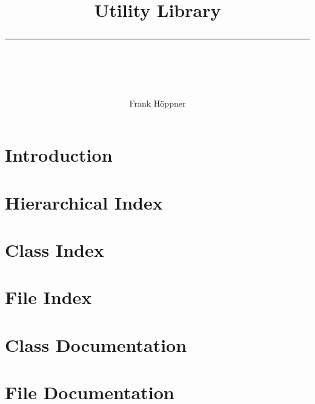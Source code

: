 \documentclass[a4paper]{book}
\begin{document}
\thispagestyle{empty}
\title{Utility Library\\[-3mm]
\rule{12cm}{1mm}\\[1cm]}
\author{Frank H\"oppner}
\maketitle

\clearemptydoublepage
{}
\tableofcontents
\clearemptydoublepage
{}
\chapter{Introduction}

%
%
%




\chapter{Hierarchical Index}

\chapter{Class Index}

\chapter{File Index}

\chapter{Class Documentation}






\chapter{File Documentation}
















\backmatter
\newpage
{}
\clearemptydoublepage
{}
\printindex
\end{document}
